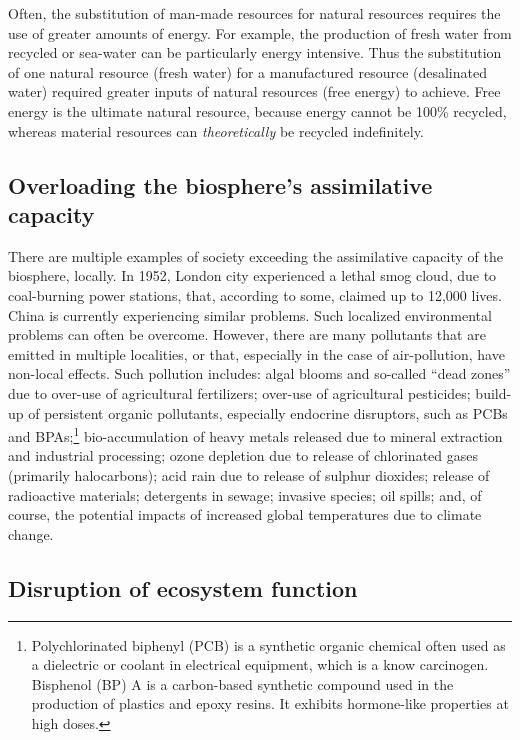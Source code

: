 Often, the substitution of man-made resources for natural resources
requires the use of greater amounts of energy.
For example, the production of fresh water from recycled or sea-water
can be particularly energy intensive.
Thus the substitution of one natural resource (fresh water)
for a manufactured resource (desalinated water)
required greater inputs of natural resources (free energy) to achieve.
Free energy is the ultimate natural resource, because energy cannot be 100\% recycled,
whereas material resources can \emph{theoretically} be recycled indefinitely.


\subsection{Overloading the biosphere's assimilative capacity}

There are multiple examples of society exceeding 
the assimilative capacity of the biosphere, locally.
In 1952, London city experienced a lethal smog cloud,
due to coal-burning power stations,
that, according to some, claimed up to 12,000 lives.\cite{Davis2002,Bell2004}
China is currently experiencing similar problems.
Such localized environmental problems can often be overcome. 
However,
there are many pollutants that are emitted in multiple localities,
or that, especially in the case of air-pollution, have non-local effects.
Such pollution includes:
algal blooms and so-called ``dead zones'' due to over-use of agricultural fertilizers;
over-use of agricultural pesticides;
build-up of persistent organic pollutants, especially endocrine disruptors, such as PCBs 
and BPAs;\footnote{Polychlorinated biphenyl (PCB) is a synthetic organic chemical often used as 
	a dielectric or coolant in electrical equipment, which is a know carcinogen.
	Bisphenol (BP) A is a carbon-based synthetic compound used in the production
	of plastics and epoxy resins. It exhibits hormone-like properties at high doses.}
bio-accumulation of heavy metals released due to mineral extraction and industrial processing;
ozone depletion due to release of chlorinated gases (primarily halocarbons);
acid rain due to release of sulphur dioxides;
release of radioactive materials;
detergents in sewage;
invasive species;
oil spills;
and, of course, the potential impacts of increased global temperatures 
due to climate change.\cite{Butler1978, UNMEA2005, Walker2012}


\subsection{Disruption of ecosystem function}


